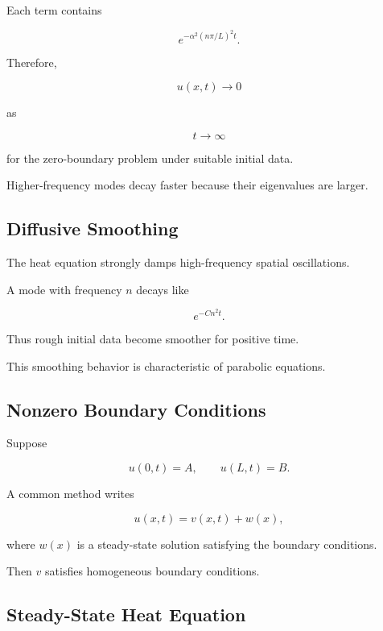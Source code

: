 Each term contains

\[
e^{-\alpha^2(n\pi/L)^2t}.
\]

Therefore,

\[
\boxed{
u(x,t)
\to0
}
\]

as

\[
t\to\infty
\]

for the zero-boundary problem under suitable initial data.

Higher-frequency modes decay faster because their eigenvalues are larger.

\subsection{Diffusive Smoothing}
\label{subsec:diffusive-smoothing}

The heat equation strongly damps high-frequency spatial oscillations.

A mode with frequency \(n\) decays like

\[
\boxed{
e^{-Cn^2t}.
}
\]

Thus rough initial data become smoother for positive time.

This smoothing behavior is characteristic of parabolic equations.

\subsection{Nonzero Boundary Conditions}
\label{subsec:nonzero-heat-boundary}

Suppose

\[
u(0,t)=A,
\qquad
u(L,t)=B.
\]

A common method writes

\[
\boxed{
u(x,t)
=
v(x,t)+w(x),
}
\]

where \(w(x)\) is a steady-state solution satisfying the boundary
conditions.

Then \(v\) satisfies homogeneous boundary conditions.

\subsection{Steady-State Heat Equation}
\label{subsec:steady-state-heat}

